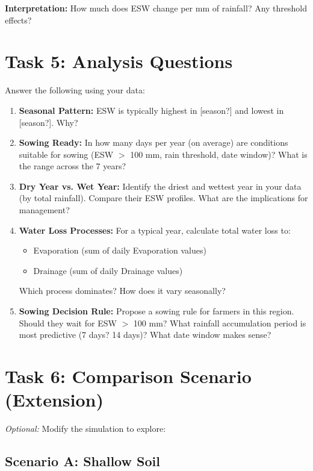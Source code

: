 \textbf{Interpretation:} How much does ESW change per mm of rainfall? Any threshold effects?

\section{Task 5: Analysis Questions}

Answer the following using your data:

\begin{enumerate}
  \item \textbf{Seasonal Pattern:} ESW is typically highest in [season?] and lowest in [season?]. Why?
  
  \item \textbf{Sowing Ready:} In how many days per year (on average) are conditions suitable for sowing (ESW $>$ 100 mm, rain threshold, date window)? What is the range across the 7 years?
  
  \item \textbf{Dry Year vs. Wet Year:} Identify the driest and wettest year in your data (by total rainfall). Compare their ESW profiles. What are the implications for management?
  
  \item \textbf{Water Loss Processes:} For a typical year, calculate total water loss to:
    \begin{itemize}
      \item Evaporation (sum of daily Evaporation values)
      \item Drainage (sum of daily Drainage values)
    \end{itemize}
    Which process dominates? How does it vary seasonally?
  
  \item \textbf{Sowing Decision Rule:} Propose a sowing rule for farmers in this region. Should they wait for ESW $>$ 100 mm? What rainfall accumulation period is most predictive (7 days? 14 days)? What date window makes sense?
\end{enumerate}

\section{Task 6: Comparison Scenario (Extension)}

\textit{Optional:} Modify the simulation to explore:

\subsection{Scenario A: Shallow Soil}

